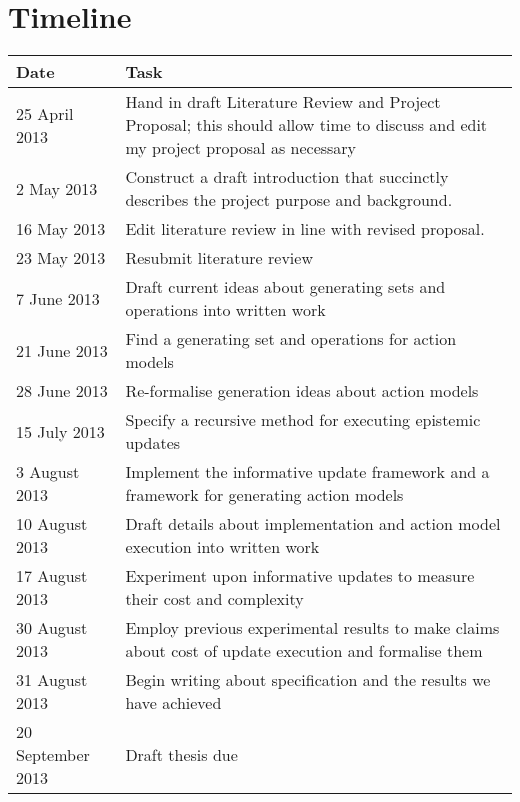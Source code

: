 \section{Timeline}

\begin{center}
	\begin{tabular}{ | l | p{10cm} |}
		\hline
		Date & Task \\
		\hline
		25 April 2013 & Hand in draft Literature Review and Project Proposal;
    this should allow time to discuss and edit my project proposal as necessary\\
		\hline
		2 May 2013 & Construct a draft introduction that succinctly describes the project purpose and background.\\
		\hline
		16 May 2013 & Edit literature review in line with revised proposal.\\
		\hline
		23 May 2013 & Resubmit literature review \\
		\hline
		7 June 2013 & Draft current ideas about generating sets and operations into
		written work\\
		\hline
		21 June 2013 & Find a generating set and operations for action models \\
		\hline
		28 June 2013 & Re-formalise generation ideas about action models\\
		\hline
		15 July 2013 & Specify a recursive method for executing epistemic updates\\
		\hline
		3 August 2013 & Implement the informative update framework and a framework
		for generating action models\\
		\hline
		10 August 2013 & Draft details about implementation and action model
		execution into written work\\
		\hline
		17 August 2013 & Experiment upon informative updates to measure their cost
		and complexity \\
		\hline
		30 August 2013 & Employ previous experimental results to make claims about
		cost of update execution and formalise them \\
		\hline
		31 August 2013 & Begin writing about specification and the results we have achieved \\
		\hline
		20 September 2013 & Draft thesis due \\
		\hline
	\end{tabular}
\end{center}
